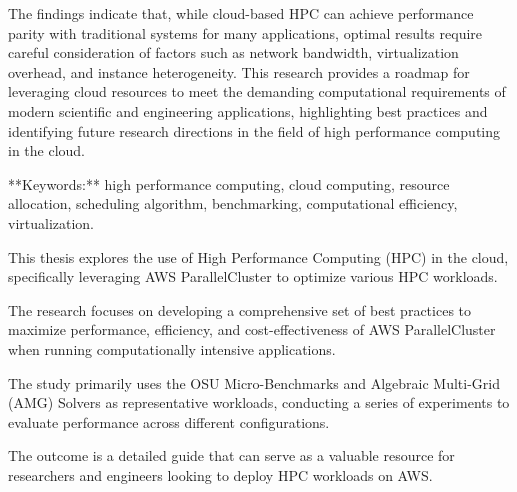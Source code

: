 The findings indicate that, while cloud-based HPC can achieve performance parity with traditional systems for many applications, optimal results require careful consideration of factors such as network bandwidth, virtualization overhead, and instance heterogeneity. This research provides a roadmap for leveraging cloud resources to meet the demanding computational requirements of modern scientific and engineering applications, highlighting best practices and identifying future research directions in the field of high performance computing in the cloud.

**Keywords:** high performance computing, cloud computing, resource allocation, scheduling algorithm, benchmarking, computational efficiency, virtualization.

This thesis explores the use of High Performance Computing (HPC) in the cloud, specifically leveraging AWS ParallelCluster to optimize various HPC workloads. 

The research focuses on developing a comprehensive set of best practices to maximize performance, efficiency, and cost-effectiveness of AWS ParallelCluster when running computationally intensive applications. 

The study primarily uses the OSU Micro-Benchmarks and Algebraic Multi-Grid (AMG) Solvers as representative workloads, conducting a series of experiments to evaluate performance across different configurations. 

The outcome is a detailed guide that can serve as a valuable resource for researchers and engineers looking to deploy HPC workloads on AWS.